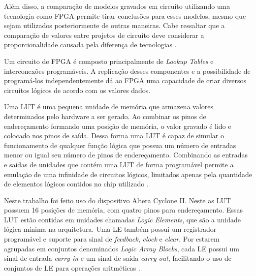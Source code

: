 Além disso, a comparação de modelos gravados em circuito utilizando uma tecnologia como FPGA permite tirar conclusões para esses modelos, mesmo que sejam utilizados posteriormente de outras maneiras. Cabe ressaltar que a comparação de valores entre projetos de circuito deve considerar a proporcionalidade causada pela diferença de tecnologias \cite{tanenbaum2009organizacao}.


Um circuito de FPGA é composto principalmente de \textit{Lookup Tables} e interconexões programáveis. A replicação desses componentes e a possibilidade de programá-los independentemente dá ao FPGA uma capacidade de criar diversos circuitos lógicos de acordo com os valores dados.

Uma LUT é uma pequena unidade de memória que armazena valores determinados pelo hardware a ser gerado. Ao combinar os pinos de endereçamento formando uma posição de memória, o valor gravado é lido e colocado nos pinos de saída. Dessa forma uma LUT é capaz de simular o funcionamento de qualquer função lógica que possua um número de entradas menor ou igual seu número de pinos de endereçamento. Combinando as entradas e saídas de unidades que contém uma LUT de forma programável permite a emulação de uma infinidade de circuitos lógicos, limitados apenas pela quantidade de elementos lógicos contidos no chip utilizado \cite{tanenbaum2009organizacao}.

Neste trabalho foi feito uso do dispositivo Altera Cyclone II. Neste as LUT possuem 16 posições de memória, com quatro pinos para endereçamento. Essas LUT estão contidas em unidades chamadas \textit{Logic Elements}, que são a unidade lógica mínima na arquitetura. Uma LE também possui um registrador programável e suporte para sinal de \textit{feedback}, \textit{clock} e \textit{clear}. Por estarem agrupadas em conjuntos denominados \textit{Logic Array Blocks}, cada LE possui um sinal de entrada \textit{carry in} e um sinal de saída \textit{carry out}, facilitando o uso de conjuntos de LE para operações aritméticas \cite{altera2007cyclone}.